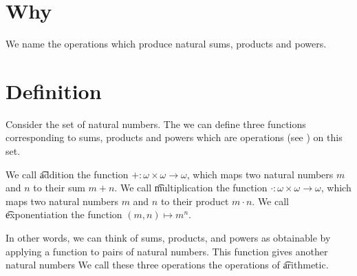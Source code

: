 

\section*{Why}

We name the operations which produce natural sums, products and powers.

\section*{Definition}

Consider the set of natural numbers.
The we can define three functions corresponding to sums, products and powers which are operations (see ) on this set.

We call \t{addition} the function $+: \omega  \times  \omega \to \omega $, which maps two natural numbers $m$ and $n$ to their sum $m + n$.
We call \t{multiplication} the function $\cdot : \omega  \times \omega  \to \omega $, which maps two natural numbers $m$ and $n$ to their product $m \cdot  n$.
We call \t{exponentiation} the function $(m, n) \mapsto m^n$.

In other words, we can think of sums, products, and powers as obtainable by applying a function to pairs of natural numbers.
This function gives another natural numbers
We call these three operations the operations of \t{arithmetic}.

\blankpage